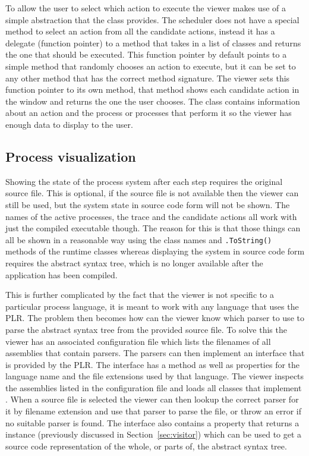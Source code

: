   To allow the user to select which action to execute the viewer makes use of
  a simple abstraction that the  class provides. The scheduler
  does not have a special method to select an action from all the candidate 
  actions, instead it has a delegate (function pointer) to a method that takes
  in a list of  classes and returns the one that should 
  be executed. This function pointer by default points to a simple method that 
  randomly chooses an action to execute, but it can be set to any other method
  that has the correct method signature. The viewer sets this function pointer
  to its own method, that method shows each candidate action in the window and
  returns the one the user chooses. The  class contains
  information about an action and the process or processes that perform it so
  the viewer has enough data to display to the user.

  \subsection{Process visualization}\label{sec:process_visualization}
	
	Showing the state of the process system after each step requires the original
	source file. This is optional, if the source file is not available then the
	viewer can still be used, but the system state in source code form will not
	be shown. The names of the active processes, the trace and the candidate 
	actions all work with just the compiled executable though. The reason for 
	this is that those things can all be shown in a reasonable way using the 
	class names and \texttt{.ToString()} methods of the runtime classes whereas 
	displaying the system in source code form  requires the abstract syntax 
	tree, which is no longer available after the application has been compiled. 
	
	This is further complicated by the fact that the viewer is not specific to 
	a particular process language, it is meant to work with any language that 
	uses the PLR. The problem then becomes how can the viewer know which parser 
	to use to parse the abstract syntax tree from the provided source file. To 
	solve this the viewer has an associated configuration file which lists the 
	filenames of all assemblies that contain parsers. The parsers can then 
	implement an  interface that is provided by the PLR. The 
	interface has a  method as well as properties for the language 
	name and the file extensions used by that language. The viewer inspects the 
	assemblies listed in the configuration file and loads all classes that 
	implement . When a source file is selected the viewer can then 
	lookup the correct parser for it by filename extension and use that parser 
	to parse the file, or throw an error if no suitable parser is found. The 
	 interface also contains a property that returns a 
	 instance (previously discussed in 
	Section~\ref{sec:visitor}) which can be used to get a source code
	representation of the whole, or parts of, the abstract syntax tree.
	
